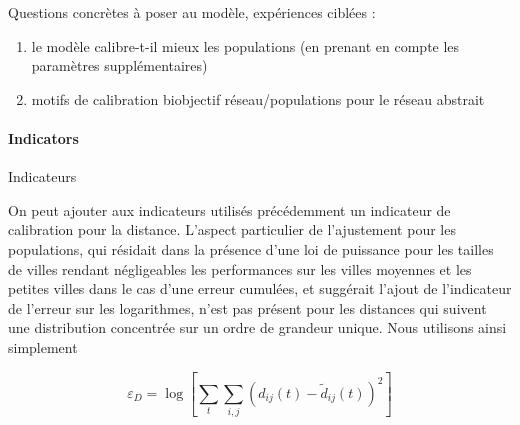 Questions concrètes à poser au modèle, expériences ciblées : 

\begin{enumerate}
\item le modèle calibre-t-il mieux les populations (en prenant en compte les paramètres supplémentaires)
\item motifs de calibration biobjectif réseau/populations pour le réseau abstrait
\end{enumerate}



\paragraph{Indicators}{Indicateurs}

On peut ajouter aux indicateurs utilisés précédemment un indicateur de calibration pour la distance. L'aspect particulier de l'ajustement pour les populations, qui résidait dans la présence d'une loi de puissance pour les tailles de villes rendant négligeables les performances sur les villes moyennes et les petites villes dans le cas d'une erreur cumulées, et suggérait l'ajout de l'indicateur de l'erreur sur les logarithmes, n'est pas présent pour les distances qui suivent une distribution concentrée sur un ordre de grandeur unique. Nous utilisons ainsi simplement

\[
\varepsilon_D = \log \left[ \sum_t \sum_{i,j} \left(d_{ij}(t) - \tilde{d}_{ij}(t)\right)^2\right]
\]












